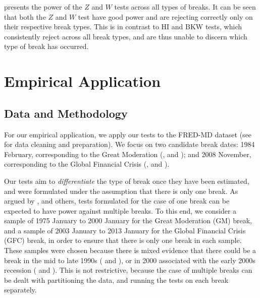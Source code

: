 \documentclass[12pt]{article}
\theoremstyle{plain}
\numberwithin{equation}{section}
\begin{document}
 presents the power of the $Z$ and $W$ tests across all types of breaks. It can be seen that both the $Z$ and $W$ test have good power and are rejecting correctly only on their respective break types. This is in contrast to HI and BKW tests, which consistently reject across all break types, and are thus unable to discern which type of break has occurred. 
\section{Empirical Application}
\subsection{Data and Methodology}
For our empirical application, we apply our tests to the FRED-MD dataset (see \textcite{mccracken_fred-md_2015} for data cleaning and preparation). We focus on two candidate break dates: 1984 February, corresponding to the Great Moderation (\textcite{baltagi_estimating_2021}, \textcite{ma_estimation_2018} and \textcite{breitung_testing_2011}); and 2008 November, corresponding to the Global Financial Crisis (\textcite{baltagi_estimating_2021}, \textcite{ma_estimation_2018} and \textcite{duan_quasi-maximum_2022}). 

Our tests aim to \emph{differentiate} the type of break once they have been estimated, and were formulated under the assumption that there is only one break. As argued by \textcite{bai_estimation_1997}, \textcite{bai_estimating_1998} and others, tests formulated for the case of one break can be expected to have power against multiple breaks. To this end, we consider a sample of 1975 January to 2000 January for the Great Moderation (GM) break, and a sample of 2003 January to 2013 January for the Global Financial Crisis (GFC) break, in order to ensure that there is only one break in each sample. These samples were chosen because there is mixed evidence that there could be a break in the mid to late 1990s (\textcite{hansen_new_2001} and \textcite{ma_group_2022}), or in 2000 associated with the early 2000s recession (\textcite{ma_estimation_2018} and \textcite{ma_group_2022}). This is not restrictive, because the case of multiple breaks can be dealt with partitioning the data, and running the tests on each break separately. 
\end{document}
